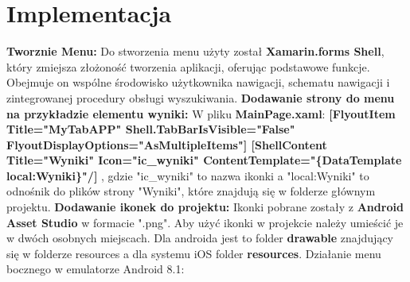 	\newpage
\section{Implementacja}		%
\textbf{Tworznie Menu:} \newline
Do stworzenia menu użyty został \textbf{Xamarin.forms Shell}, który zmiejsza złożoność tworzenia aplikacji, oferując podstawowe funkcje. Obejmuje on wspólne środowisko użytkownika nawigacji, schematu nawigacji i zintegrowanej procedury obsługi wyszukiwania.
\newline
\newline
\textbf{Dodawanie strony do menu na przykładzie elementu wyniki:}
\newline
W pliku \textbf{MainPage.xaml}:
\newline
\newline
\textbf{[FlyoutItem Title="MyTabAPP" \newline
\hspace{1cm}Shell.TabBarIsVisible="False" \newline
\hspace{1cm}FlyoutDisplayOptions="AsMultipleItems"] \newline
\hspace{0.5cm}[ShellContent Title="Wyniki" Icon="ic\_wyniki" \newline
ContentTemplate="\{DataTemplate local:Wyniki\}"/] \newline
[/FlyoutItem]} \newline
\newline
, gdzie "ic\_wyniki" to nazwa ikonki a "local:Wyniki" to odnośnik do plików strony "Wyniki", które znajdują się w folderze głównym projektu. 
\newline
\newline
\textbf{Dodawanie ikonek do projektu:} \newline
Ikonki pobrane zostały z \textbf{Android Asset Studio} w formacie ".png". \newline
Aby użyć ikonki w projekcie należy umieścić je w dwóch osobnych miejscach. Dla androida jest to folder \textbf{drawable} znajdujący się w folderze resources a dla systemu iOS folder \textbf{resources}.
\newline \newline
\newpage
Działanie menu bocznego w emulatorze Android 8.1:
